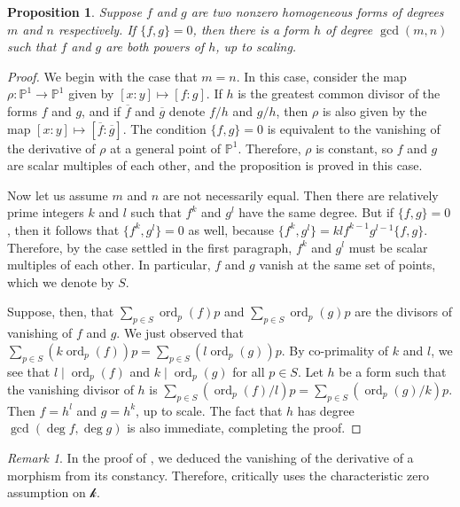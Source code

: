 \documentclass[reqno, 11pt]{amsart}
\theoremstyle{plain}
\newtheorem{proposition}[theorem]{Proposition}
\theoremstyle{remark}
\newtheorem{remark}[theorem]{Remark}
\renewcommand{\P}{\mathbb{P}}
\renewcommand{\k}{\mathscr{k}}
\DeclareMathOperator{\ord}{ord}
\begin{document}
       
   
   \begin{proposition}
       \label{lemma:indeterminacy}
       Suppose $f$ and $g$ are two nonzero homogeneous forms of degrees $m$ and $n$ respectively. If $\{f,g\} = 0$, then there is a form $h$ of degree $\gcd(m, n)$ such that $f$ and $g$ are both powers of $h$, up to scaling.  
   \end{proposition}
   \begin{proof}
       We begin with the case that $m = n$. In this case, consider the map $\rho: \P^1 \to \P^{1}$ given by $[x:y] \mapsto [f:g]$. If $h$ is the greatest common divisor of the forms $f$ and $g$, and if $\overline{f}$ and $\overline{g}$ denote $f/h$ and $g/h$, then $\rho$ is also given by the map $[x:y] \mapsto [\overline{f}:\overline{g}]$. The condition $\{f,g\} = 0$ is equivalent to the vanishing of the derivative of $\rho$ at a general point of $\P^{1}$. Therefore, $\rho$ is constant, so $f$ and $g$ are scalar multiples of each other, and the proposition is proved in this case.
   
       Now let us assume $m$ and $n$ are not necessarily equal.  Then there are relatively prime integers $k$ and $l$ such that $f^{k}$ and $g^{l}$ have the same degree. But if $\{f,g\} = 0$, then it follows that $\{f^{k},g^{l}\} = 0$ as well, because $\{f^{k},g^{l}\} = klf^{k-1}g^{l-1}\{f,g\}$. Therefore, by the case settled in the first paragraph,  $f^{k}$ and $g^{l}$ must be scalar multiples of each other. In particular, $f$ and $g$ vanish at the same set of points, which we denote by $S$.
   
       Suppose, then, that $\sum_{p \in S} \ord_{p}(f) p$ and $\sum_{p \in S} \ord_{p}(g) p$ are the divisors of vanishing of $f$ and $g$.  We just observed that $\sum_{p \in S} (k \ord_{p}(f)) p = \sum_{p \in S} (l \ord_{p}(g)) p$. By co-primality of $k$ and $l$, we see that $l \mid \ord_{p}(f)$ and $k \mid \ord_{p}(g)$ for all $p \in S$. Let $h$ be a form such that the vanishing divisor of $h$ is $\sum_{p \in S} (\ord_{p}(f)/l) p = \sum_{p \in S} (\ord_{p}(g)/k) p$. Then $f = h^{l}$ and $g = h^{k}$, up to scale.  The fact that $h$ has degree $\gcd(\deg f, \deg g)$ is also immediate, completing the proof.
   \end{proof}

   \begin{remark}
    \label{remark:indeterminacycharacteristic}
    In the proof of , we deduced the vanishing of the derivative of a morphism from its constancy. Therefore,  critically uses the characteristic zero assumption on $\k$.
\end{remark}
\end{document}

